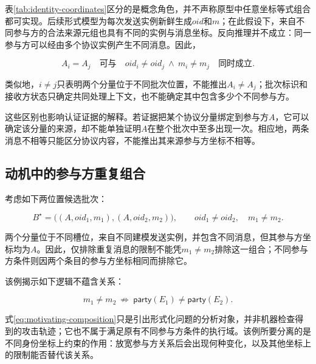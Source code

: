 表\ref{tab:identity-coordinates}区分的是概念角色，并不声称原型中任意坐标等式组合都可实现。后续形式模型为每次发送实例新鲜生成$\mathit{oid}$和$m$；在此假设下，来自不同参与方的合法来源元组也具有不同的实例与消息坐标。反向推理并不成立：同一参与方可以经由多个协议实例产生不同消息。因此，

\begin{equation}
  A_i=A_j
  \quad\text{可与}\quad
  \mathit{oid}_i\neq\mathit{oid}_j
  \ \land\ 
  m_i\neq m_j
  \quad\text{同时成立}.
  \label{eq:same-party-different-message}
\end{equation}

类似地，$i\neq j$只表明两个分量位于不同批次位置，不能推出$A_i\neq A_j$；批次标识和接收方状态只确定共同处理上下文，也不能确定其中包含多少个不同参与方。

这些区别也影响认证证据的解释。若证据把某个协议分量绑定到参与方$A$，它可以确定该分量的来源，却不能单独证明$A$在整个批次中至多出现一次。相应地，两条消息不相等只能区分协议内容，不能推出其来源参与方坐标不相等。

\subsection{动机中的参与方重复组合}

考虑如下两位置候选批次：

\begin{equation}
  B^{\star}
  =\bigl((A,\mathit{oid}_1,m_1),
          (A,\mathit{oid}_2,m_2)\bigr),
  \qquad
  \mathit{oid}_1\neq\mathit{oid}_2,
  \quad m_1\neq m_2.
  \label{eq:motivating-composition}
\end{equation}

两个分量位于不同槽位，来自不同建模发送实例，并包含不同消息，但其参与方坐标均为$A$。因此，仅排除重复消息的限制不能凭$m_1\neq m_2$排除这一组合；不同参与方条件则因两个条目的参与方坐标相同而排除它。

该例揭示如下逻辑不蕴含关系：

\begin{equation}
  m_1\neq m_2
  \ \not\Longrightarrow\ 
  \mathsf{party}(E_1)\neq\mathsf{party}(E_2).
  \label{eq:message-does-not-imply-party}
\end{equation}

式\eqref{eq:motivating-composition}只是引出形式化问题的分析对象，并非机器检查得到的攻击轨迹；它也不属于满足\kwaay 原有不同参与方条件的执行域。该例所要分离的是不同身份坐标上约束的作用：放宽参与方关系后会出现何种变化，以及其他坐标上的限制能否替代该关系。

